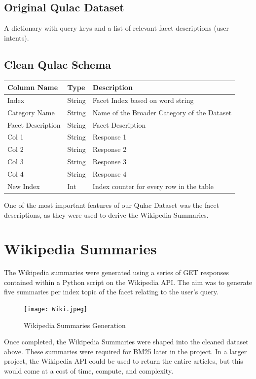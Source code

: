 \documentclass[11pt]{article}
\begin{document}
\subsection{Original Qulac Dataset}
A dictionary with query keys and a list of relevant facet descriptions (user intents).

\subsection{Clean Qulac Schema}
\begin{longtable}{|l|l|p{8cm}|}
\hline
\textbf{Column Name} & \textbf{Type} & \textbf{Description} \\ \hline
Index & String & Facet Index based on word string \\ \hline
Category Name & String & Name of the Broader Category of the Dataset \\ \hline
Facet Description & String & Facet Description \\ \hline
Col 1 & String & Response 1 \\ \hline
Col 2 & String & Response 2 \\ \hline
Col 3 & String & Response 3 \\ \hline
Col 4 & String & Response 4 \\ \hline
New Index & Int & Index counter for every row in the table \\ \hline
\end{longtable}

One of the most important features of our Qulac Dataset was the facet descriptions, as they were used to derive the Wikipedia Summaries.

\section{Wikipedia Summaries}
The Wikipedia summaries were generated using a series of GET responses contained within a Python script on the Wikipedia API. The aim was to generate five summaries per index \textendash{} topic of the facet \textendash{} relating to the user's query.

\begin{figure}[h]
    \centering
    \texttt{[image: Wiki.jpeg]}
    \caption{Wikipedia Summaries Generation}
    \label{fig:wikipedia method}
\end{figure}


Once completed, the Wikipedia Summaries were shaped into the cleaned dataset above. These summaries were required for BM25 later in the project. In a larger project, the Wikipedia API could be used to return the entire articles, but this would come at a cost of time, compute, and complexity.
\end{document}
